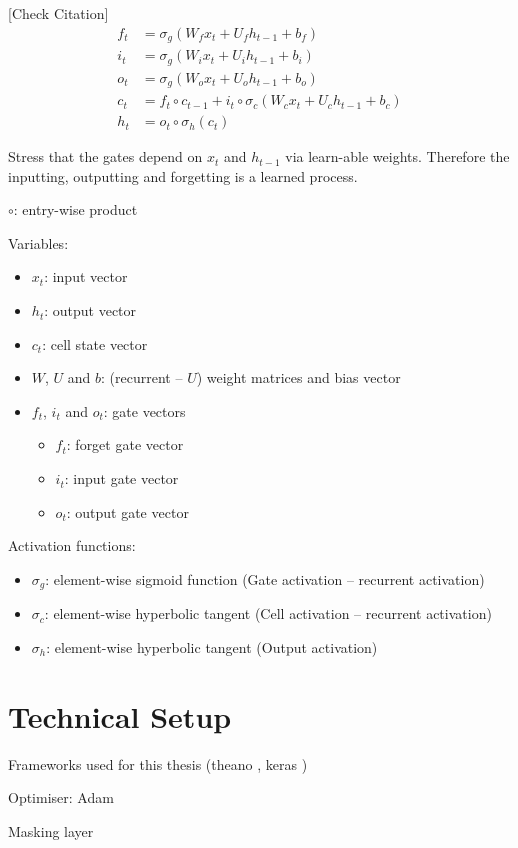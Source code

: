 [Check Citation]\cite{lstm}
\begin{align*}
  f_t &= \sigma_g( W_f x_t + U_f h_{t-1} + b_f) \\
  i_t &= \sigma_g( W_i x_t + U_i h_{t-1} + b_i) \\
  o_t &= \sigma_g( W_o x_t + U_o h_{t-1} + b_o) \\
  c_t &= f_t \circ c_{t-1} + i_t \circ \sigma_c(W_c x_t + U_c h_{t-1} + b_c) \\
  h_t &= o_t \circ \sigma_h(c_t)
\end{align*}

Stress that the gates depend on $x_t$ and $h_{t-1}$ via learn-able weights.
Therefore the inputting, outputting and forgetting is a learned process.

$\circ$: entry-wise product


Variables:
\begin{itemize}
\item $x_t$: input vector
\item $h_t$: output vector
\item $c_t$: cell state vector
\item $W$, $U$ and $b$: (recurrent -- $U$) weight matrices and bias vector
\item $f_t$, $i_t$ and $o_t$: gate vectors
  \begin{itemize}
  \item $f_t$: forget gate vector
  \item $i_t$: input gate vector
  \item $o_t$: output gate vector
  \end{itemize}
\end{itemize}

Activation functions:
\begin{itemize}
\item $\sigma_g$: element-wise sigmoid function (Gate activation -- recurrent
  activation)
\item $\sigma_c$: element-wise hyperbolic tangent (Cell activation -- recurrent
  activation)
\item $\sigma_h$: element-wise hyperbolic tangent (Output activation)
\end{itemize}


\section{Technical Setup}
\label{sec:tech_setup}

Frameworks used for this thesis (theano \cite{theano}, keras \cite{keras})

Optimiser: Adam

Masking layer


